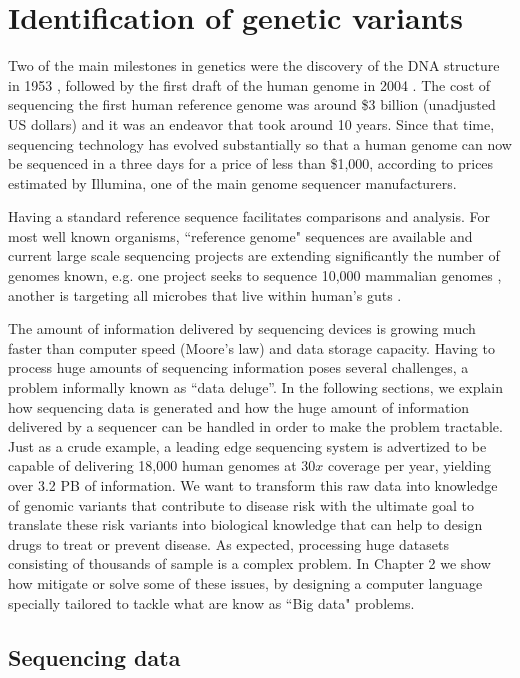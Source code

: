 \section{Identification of genetic variants}

Two of the main milestones in genetics were the discovery of the DNA structure in 1953 \cite{watson1953molecular}, followed by the first draft of the human genome in 2004 \cite{collins2004finishing}. The cost of sequencing the first human reference genome was around \$3 billion (unadjusted US dollars) and it was an endeavor that took around 10 years. Since that time, sequencing technology has evolved substantially so that a human genome can now be sequenced in a three days for a price of less than \$1,000, according to prices estimated by Illumina, one of the main genome sequencer manufacturers.

Having a standard reference sequence facilitates comparisons and analysis. For most well known organisms, ``reference genome" sequences are available and current large scale sequencing projects are extending significantly the number of genomes known, e.g. one project seeks to sequence 10,000 mammalian genomes \cite{haussler2009genome}, another is targeting all microbes that live within human’s guts \cite{turnbaugh2007human}.

The amount of information delivered by sequencing devices is growing much faster than computer speed (Moore's law) and data storage capacity. Having to process huge amounts of sequencing information poses several challenges, a problem informally known as ``data deluge''. In the following sections, we explain how sequencing data is generated and how the huge amount of information delivered by a sequencer can be handled in order to make the problem tractable. Just as a crude example, a leading edge sequencing system is advertized to be capable of delivering 18,000 human genomes at $30x$ coverage per year, yielding over 3.2 PB of information. We want to transform this raw data into knowledge of genomic variants that contribute to disease risk with the ultimate goal to translate these risk variants into biological knowledge that can help to design drugs to treat or prevent disease. As expected, processing huge datasets consisting of thousands of sample is a complex problem. In Chapter 2 we show how mitigate or solve some of these issues, by designing a computer language specially tailored to tackle what are know as ``Big data" problems.

\subsection{Sequencing data}

